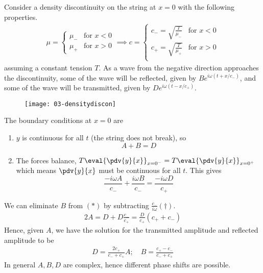 Consider a density discontinuity on the string at $x = 0$ with the following properties.
\begin{align*}
	\mu = \begin{cases}
		\mu_- & \text{for } x < 0 \\
		\mu_+ & \text{for } x > 0
	\end{cases} \implies c = \begin{cases}
		c_- = \sqrt{\frac{T}{\mu_-}} & \text{for } x < 0 \\
		c_+ = \sqrt{\frac{T}{\mu_+}} & \text{for } x > 0 \\
	\end{cases}
\end{align*}
assuming a constant tension $T$.
As a wave from the negative direction approaches the discontinuity, some of the wave will be reflected, given by $B e^{i \omega(t + x/c_-)}$, and some of the wave will be transmitted, given by $D e^{i \omega(t - x/c_+)}$.
\begin{figure}[h] 
    \centering 
    \texttt{[image: 03-densitydiscon]} 
\end{figure}
The boundary conditions at $x = 0$ are
\begin{enumerate}
	\item $y$ is continuous for all $t$ (the string does not break), so
	\begin{equation}
		A + B = D \tag{$\ast$}
	\end{equation}
	\item The forces balance, $T \eval{\pdv{y}{x}}_{x = 0^-} = T \eval{\pdv{y}{x}}_{x = 0^+}$ which means $\pdv{y}{x}$ must be continuous for all $t$.
	This gives
	\begin{equation}
		\frac{-i\omega A}{c_-} + \frac{i \omega B}{c_-} = \frac{-i \omega D}{c_+} \tag{$\dagger$}
	\end{equation}
\end{enumerate}
We can eliminate $B$ from $(\ast)$ by subtracting $\frac{c_-}{i \omega}(\dagger)$.
\begin{align*}
	2A = D + D \frac{c_-}{c_+} = \frac{D}{c_+}(c_+ + c_-)
\end{align*}
Hence, given $A$, we have the solution for the transmitted amplitude and reflected amplitude to be
\setcounter{equation}{15}
\begin{align} \label{eq:3.16}
	D = \frac{2 c_+}{c_- + c_+} A;\quad B = \frac{c_+ - c_-}{c_- + c_+}
\end{align}
In general $A, B, D$ are complex, hence different phase shifts are possible.


